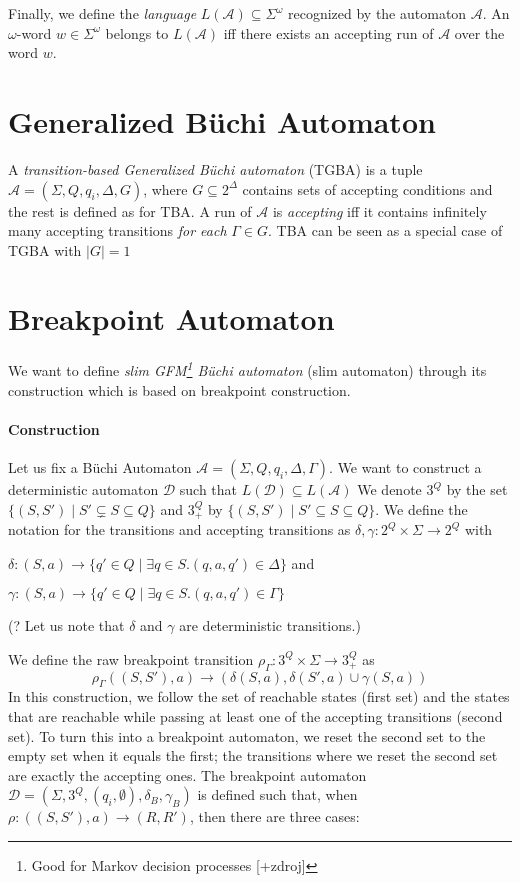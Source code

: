 \documentclass[
	digital
nolof, nolot
]{fithesis3}
\newcommand{\cA}{\mathcal{A}}
\newcommand{\cD}{\mathcal{D}}
\newcommand{\lA}{L(\cA)}
\newcommand{\lD}{L(\cD)}
\begin{document}
			Finally, we define the \emph{language} $\lA \subseteq \Sigma^\omega$ recognized by the automaton $\cA$. An $\omega$-word $w \in \Sigma^\omega$ belongs to $\lA$ iff there exists an accepting run of $\cA$ over the word $w$. 
			
		\section{Generalized Büchi Automaton}
		A \emph{transition-based Generalized Büchi automaton} (TGBA) is a tuple $\cA=(\Sigma, Q, q_i, \Delta, G)$, where $G \subseteq 2^\Delta$ contains sets of accepting conditions and the rest is defined as for TBA. A run of $\cA$ is \emph{accepting} iff it contains infinitely many accepting transitions \emph{for each} $\Gamma \in G$. TBA can be seen as a special case of TGBA with $|G|=1$
		
		\section{Breakpoint Automaton}
			We want to define \emph{slim GFM\footnote{Good for Markov decision processes [+zdroj]} Büchi automaton} (slim automaton) through its construction which is based on breakpoint construction. 
			\paragraph{Construction}
			Let us fix a Büchi Automaton $\cA=(\Sigma, Q, q_i, \Delta, \Gamma)$. 
			We want to construct a deterministic automaton $\cD$ such that $\lD\subseteq \lA$ 
			We denote $3^Q$ by the set $\{(S,S') \mid S'\subsetneq S \subseteq Q\}$ and
			$3^Q_+$ by $\{(S,S') \mid S'\subseteq S \subseteq Q\}$.
			We define the notation for the transitions and accepting transitions as $\delta,\gamma:2^Q \times \Sigma \rightarrow 2^Q$ with
			
			$\delta: (S,a)\rightarrow\{q'\in Q \mid \exists q \in S.(q,a,q') \in \Delta\}$ and
			
			$\gamma: (S,a)\rightarrow\{q'\in Q \mid \exists q \in S.(q,a,q') \in \Gamma\}$
			
			(? Let us note that $\delta$ and $\gamma$ are deterministic transitions.)
			
			We define the raw breakpoint transition
			$\rho_\Gamma \colon 3^Q \times \Sigma \rightarrow 3^Q_+$ as
			\[\rho_\Gamma((S, S'), a) \rightarrow(\delta(S, a), \delta(S',a)\cup \gamma(S, a))\]
			In this construction, we follow the set of reachable states (first set) and the states that are reachable while passing at least one of the accepting transitions (second set).
			To turn this into a breakpoint automaton, we reset the second set to the empty set when it equals the first; the transitions where we reset the second set are exactly the accepting ones.
			The breakpoint automaton $\cD = (\Sigma, 3^Q, (q_i, \emptyset), \delta_B, \gamma_B)$ is defined such that, when $\rho\colon ((S, S'), a) \rightarrow (R, R')$, then there are three cases:
			
\end{document}
